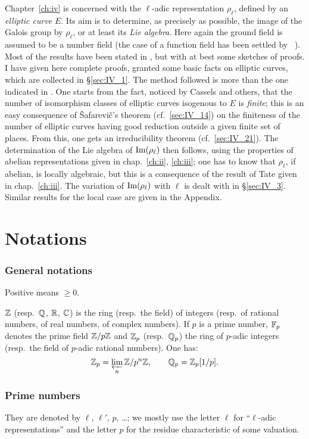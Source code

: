 Chapter~\ref{ch:iv} is concerned with the $\ell$-adic representation
$\rho_\ell$, defined by an \emph{elliptic curve} $E$. Its aim is to determine,
as precisely as possible, the image of the Galois group by $\rho_\ell$, or at
least its \emph{Lie algebra}. Here again the ground field is assumed to be a
number field (the case of a function field has been settled by
\citeauthor{10}~\cite{10}).  Most of the results have been stated in \cite{25},
\cite{31} but with at best some sketches of proofs. I have given here complete
proofs, granted some basic facts on elliptic curves, which are collected in
\S\ref{sec:IV_1}. The method followed is more  than the one
indicated in \cite{25}. One starts from the fact, noticed by Cassels and
others, that the number of isomorphism classes of elliptic curves isogenous to
$E$ is \emph{finite}; this is an easy consequence of \v Safarevi\v c's theorem
(cf.\ \ref{sec:IV_14}) on the finiteness of the number of elliptic curves
having good reduction outside a given finite set of places. From this, one gets
an irreducibility theorem (cf.\ \ref{sec:IV_21}). The determination of the Lie
algebra of $\operatorname{Im}(\rho_\ell)$ then follows, using the properties of abelian
representations given in chap.~\ref{ch:ii}, \ref{ch:iii}; one has to know that
$\rho_\ell$, if abelian, is locally algebraic, but this is a consequence of the
result of Tate given in chap.~\ref{ch:iii}. The variation of $\operatorname{Im}(\rho_\ell)$
with $\ell$ is dealt with in \S\ref{sec:IV_3}. Similar results for the local
case are given in the Appendix.

\chapter*{Notations}
\subsection*{General notations}
Positive means $\ge 0$.

$\mathbb{Z}$ (resp.\ $\mathbb{Q}$, $\mathbb{R}$, $\mathbb{C}$) is the ring (resp.\ the field) of integers
(resp.\ of rational numbers, of real numbers, of complex numbers).  If $p$ is a
prime number, $\mathbb{F}_p$ denotes the prime field $\mathbb{Z}/p\mathbb{Z}$ and $\mathbb{Z}_p$ (resp.\
$\mathbb{Q}_p$) the ring of $p$-adic integers (resp.\ the field of $p$-adic rational
numbers). One has:
\[
	\mathbb{Z}_p = \varprojlim_n \mathbb{Z}/p^n\mathbb{Z}, \qquad \mathbb{Q}_p = \mathbb{Z}_p[1/p].
\]

\subsection*{Prime numbers}
They are denoted by $\ell$, $\ell'$, $p$, \ldots; we mostly use the letter
$\ell$ for ``$\ell$-adic representations'' and the letter $p$ for the residue
characteristic of some valuation.

